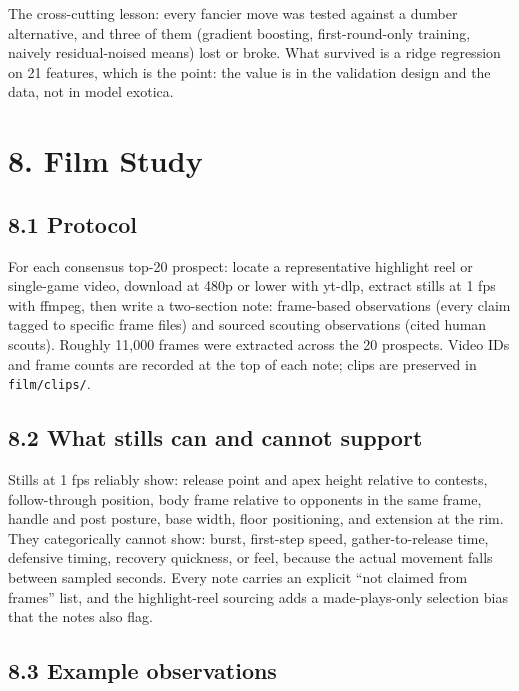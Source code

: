 \documentclass[
  10pt,
]{article}
\begin{document}
The cross-cutting lesson: every fancier move was tested against a dumber
alternative, and three of them (gradient boosting, first-round-only training,
naively residual-noised means) lost or broke. What survived is a ridge
regression on 21 features, which is the point: the value is in the validation
design and the data, not in model exotica.

\section{8. Film Study}\label{film-study}

\subsection{8.1 Protocol}\label{protocol}

For each consensus top-20 prospect: locate a representative highlight reel or
single-game video, download at 480p or lower with yt-dlp, extract stills at 1
fps with ffmpeg, then write a two-section note: frame-based observations (every
claim tagged to specific frame files) and sourced scouting observations (cited
human scouts). Roughly 11,000 frames were extracted across the 20 prospects.
Video IDs and frame counts are recorded at the top of each note; clips are
preserved in \texttt{film/clips/}.

\subsection{8.2 What stills can and cannot
support}\label{what-stills-can-and-cannot-support}

Stills at 1 fps reliably show: release point and apex height relative to
contests, follow-through position, body frame relative to opponents in the same
frame, handle and post posture, base width, floor positioning, and extension at
the rim. They categorically cannot show: burst, first-step speed,
gather-to-release time, defensive timing, recovery quickness, or feel, because
the actual movement falls between sampled seconds. Every note carries an
explicit ``not claimed from frames'' list, and the highlight-reel sourcing adds
a made-plays-only selection bias that the notes also flag.

\subsection{8.3 Example observations}\label{example-observations}
\end{document}
